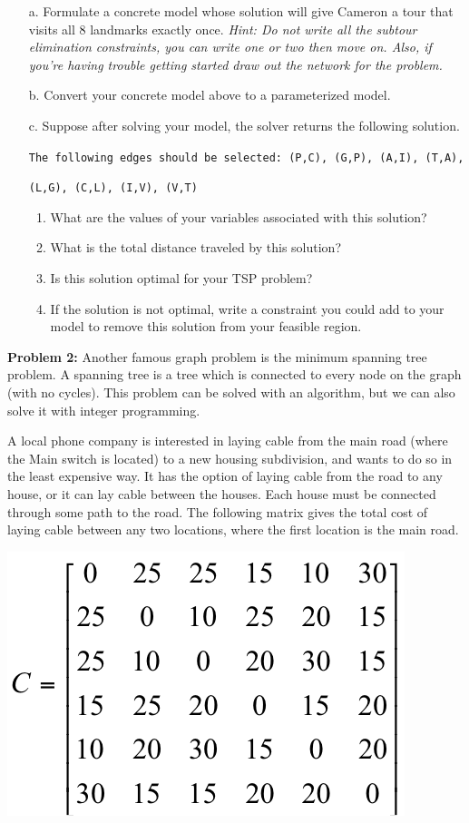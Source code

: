 \documentclass[11pt]{article}
\theoremstyle{definition}
\begin{document}
\begin{enumerate}
\item[a.] Formulate a concrete model whose solution will give Cameron a tour that visits all 8 landmarks exactly once. \emph{Hint: Do not write all the subtour elimination constraints, you can write one or two then move on. Also, if you're having trouble getting started draw out the network for the problem.}
\item[b.] Convert your concrete model above to a parameterized model.
\item[c.] Suppose after solving your model, the solver returns the following solution. 

\verb|The following edges should be selected: (P,C), (G,P), (A,I), (T,A),| 

\verb|(L,G), (C,L), (I,V), (V,T)|
	\begin{enumerate}
	\item What are the values of your variables associated with this solution?
	\item What is the total distance traveled by this solution?
	\item Is this solution optimal for your TSP problem?
	\item If the solution is not optimal, write a constraint you could add to your model to remove this solution from your feasible region.
	\end{enumerate}
\end{enumerate}

\newpage

\textbf{Problem 2:} Another famous graph problem is the minimum spanning tree problem. A spanning tree is a tree which is connected to every node on the graph (with no cycles). This problem can be solved with an algorithm, but we can also solve it with integer programming.

A local phone company is interested in laying cable from the main road (where the
Main switch is located) to a new housing subdivision, and wants to do so in the least
expensive way.  It has the option of laying cable from the road to any house, or it can 
lay cable between the houses.  Each house must be connected through some path to 
the road.  The following matrix gives the total cost of laying cable between any two
locations, where the first location is the main road.

\begin{center}
\includegraphics[width = .3\textwidth]{costs}
\end{center}
\end{document}
